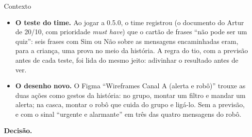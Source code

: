 \begin{especificacao}{Contexto}
\begin{itemize}
  \item \textbf{O teste do time.} Ao jogar a 0.5.0, o time registrou (o
    documento do Artur de 20/10, com prioridade \emph{must have}) que o cartão
    de frases \enquote{não pode ser um quiz}: seis frases com Sim ou Não sobre
    as mensagens encaminhadas eram, para a criança, uma prova no meio da
    história. A regra do tio, com a previsão antes de cada teste, foi lida do
    mesmo jeito: adivinhar o resultado antes de ver.
  \item \textbf{O desenho novo.} O Figma \enquote{Wireframes Canal A (alerta e
    robô)} trouxe as duas ações como gestos da história: no grupo, montar um
    filtro e mandar um alerta; na casca, montar o robô que cuida do grupo e
    ligá-lo. Sem a previsão, e com o sinal \enquote{urgente e alarmante} em
    três das quatro mensagens do robô.
\end{itemize}
\end{especificacao}

\textbf{Decisão.}


